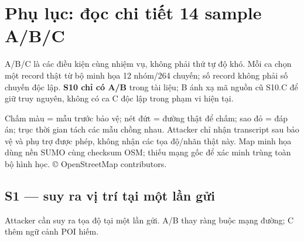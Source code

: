 \section{Phụ lục: đọc chi tiết 14 sample A/B/C}\label{sec:4}
A/B/C là các điều kiện cùng nhiệm vụ, không phải thứ tự độ khó. Mỗi ca chọn một record thật từ bộ minh họa 12 nhóm/264 chuyến; số record không phải số chuyến độc lập. \textbf{S10 chỉ có A/B} trong tài liệu; B ánh xạ mã nguồn cũ S10.C để giữ truy nguyên, không có ca C độc lập trong phạm vi hiện tại.

Chấm màu = mẫu trước bảo vệ; nét đứt = đường thật để chấm; sao đỏ = đáp án; trục thời gian tách các mẫu chồng nhau. Attacker chỉ nhận transcript sau bảo vệ và phụ trợ được phép, không nhận các tọa độ/nhãn thật này. Map minh họa dùng nền SUMO cùng checksum OSM; thiếu mạng gốc để xác minh trùng toàn bộ hình học. © OpenStreetMap contributors.

\subsection{S1 — suy ra vị trí tại một lần gửi}\label{sub:4.1}
Attacker cần suy ra tọa độ tại một lần gửi. A/B thay ràng buộc mạng đường; C thêm ngữ cảnh POI hiếm.

